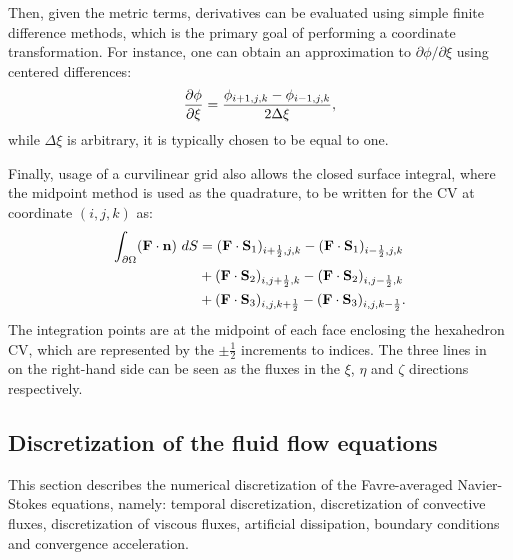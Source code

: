 Then, given the metric terms, derivatives can be evaluated using simple finite difference methods, which is the primary goal of performing a coordinate transformation. For instance, one can obtain an approximation to $\partial \phi / \partial \xi$ using centered differences:
\begin{equation*}
     \frac{\partial \phi}{\partial \xi}  = \frac{\phi_{i+1,j,k} - \phi_{i-1,j,k}}{2\Delta \xi},
\end{equation*}
while $\Delta \xi$ is arbitrary, it is typically chosen to be equal to one. 

Finally, usage of a curvilinear grid also allows the closed surface integral, where the midpoint method is used as the quadrature, to be written for the CV at coordinate $(i,j,k)$ as:
\begin{align}
    \begin{split}
    \int_{\partial \Omega} (\mathbf{F}\cdot\mathbf{n})~dS &= 
        (\mathbf{F}\cdot \mathbf{S}_1)_{i+\frac{1}{2},j,k}
      - (\mathbf{F}\cdot \mathbf{S}_1)_{i-\frac{1}{2},j,k} \\
      &+ (\mathbf{F}\cdot \mathbf{S}_2)_{i,j+\frac{1}{2},k}
      - (\mathbf{F}\cdot \mathbf{S}_2)_{i,j-\frac{1}{2},k} \\
      &+ (\mathbf{F}\cdot \mathbf{S}_3)_{i,j,k+\frac{1}{2}}
      - (\mathbf{F}\cdot \mathbf{S}_3)_{i,j,k-\frac{1}{2}}.
    \end{split}
    \label{eq:synflux}
\end{align}
The integration points are at the midpoint of each face enclosing the hexahedron CV, which are represented by the $\pm \frac{1}{2}$ increments to indices. The three lines in~ on the right-hand side can be seen as the fluxes in the $\xi$, $\eta$ and $\zeta$ directions respectively.
%
\subsection{Discretization of the fluid flow equations}
\label{sec:synns}
%
This section describes the numerical discretization of the Favre-averaged Navier-Stokes equations, namely: temporal discretization, discretization of convective fluxes, discretization of viscous fluxes, artificial dissipation, boundary conditions and convergence acceleration.
%
